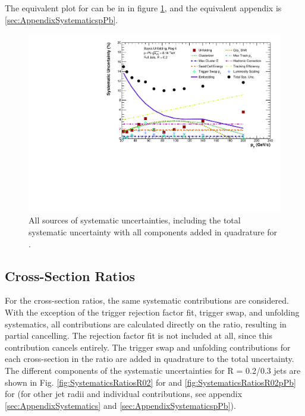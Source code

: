 The equivalent plot for \pPb can be in in figure \ref{fig:SystematicsSpectraR02pPb}, and the equivalent appendix is \ref{sec:AppendixSystematicspPb}.

\begin{figure}
    \centering
    \includegraphics[width=15cm]{figures/pPbFigures/Systematics/TotalSystematics_R02.pdf}
    \caption{All sources of systematic uncertainties, including the total systematic uncertainty with all components added in quadrature for \pPb.}
    \label{fig:SystematicsSpectraR02pPb}
\end{figure}

\subsection{Cross-Section Ratios}
\label{sec:SystematicsRatios}

For the cross-section ratios, the same systematic contributions are considered. With the exception of the trigger rejection factor fit, trigger swap, and unfolding systematics, all contributions are calculated directly on the ratio, resulting in partial cancelling. The rejection factor fit is not included at all, since this contribution cancels entirely. The trigger swap and unfolding contributions for each cross-section in the ratio are added in quadrature to the total uncertainty. The different components of the systematic uncertainties for R = 0.2/0.3 jets are shown in Fig. \ref{fig:SystematicsRatiosR02} for \pp and \ref{fig:SystematicsRatiosR02pPb} for \pPb (for other jet radii and individual contributions, see appendix \ref{sec:AppendixSystematics} and \ref{sec:AppendixSystematicspPb}).

